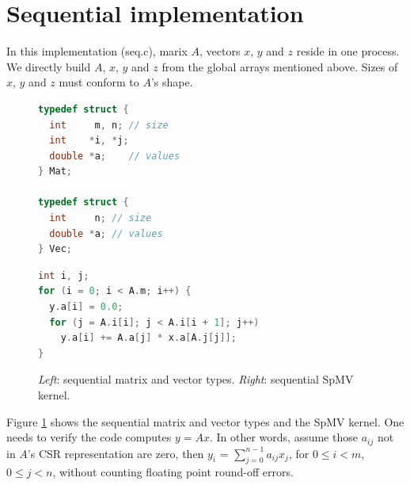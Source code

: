 \documentclass[creativecommons]{eptcs}
\begin{document}
\section{Sequential implementation}
\label{sec:seq}
In this implementation (seq.c), marix $A$, vectors $x$, $y$ and $z$ reside in one process.
We directly build $A$, $x$, $y$ and $z$ from the global arrays mentioned above.
Sizes of $x$, $y$ and $z$ must conform to $A$'s shape.
\vspace{-10pt}
\begin{figure}[h]
\begin{minipage}{0.35\textwidth}
\begin{lstlisting}[language=C]
typedef struct {
  int     m, n; // size
  int    *i, *j;
  double *a;    // values
} Mat;

typedef struct {
  int     n; // size
  double *a; // values
} Vec;
\end{lstlisting}
\end{minipage}
\hfill
\begin{minipage}{0.55\textwidth}
  \begin{lstlisting}[language=C]
int i, j;
for (i = 0; i < A.m; i++) {
  y.a[i] = 0.0;
  for (j = A.i[i]; j < A.i[i + 1]; j++)
    y.a[i] += A.a[j] * x.a[A.j[j]];
}
\end{lstlisting}
\end{minipage}
\vspace{-10pt}
\caption{{\it Left}: sequential matrix and vector types. {\it Right}: sequential SpMV kernel.}
\label{fig:seqspmv}
\vspace{-5pt}
\end{figure}

Figure \ref{fig:seqspmv} shows the sequential matrix and vector types and the SpMV kernel.
One needs to verify the code computes $y=Ax$. In other words, assume those $a_{ij}$
not in $A$'s CSR representation are zero, then $y_i$ = $\sum_{j=0}^{n-1}a_{ij} x_j$,
for $0\leq i < m$, $0 \leq j < n$, without counting floating point round-off errors.

\end{document}
